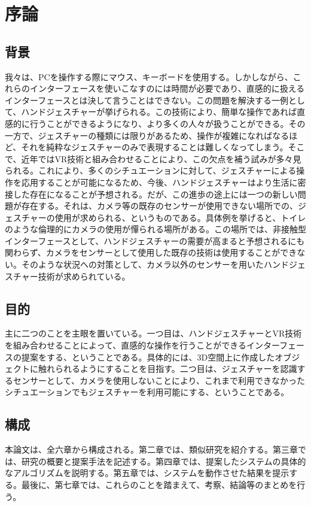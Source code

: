 \section{序論}

\subsection{背景}
我々は、PCを操作する際にマウス、キーボードを使用する。しかしながら、これらのインターフェースを使いこなすのには時間が必要であり、直感的に扱えるインターフェースとは決して言うことはできない。この問題を解決する一例として、ハンドジェスチャーが挙げられる。この技術により、簡単な操作であれば直感的に行うことができるようになり、より多くの人々が扱うことができる。その一方で、ジェスチャーの種類には限りがあるため、操作が複雑になればなるほど、それを純粋なジェスチャーのみで表現することは難しくなってしまう。そこで、近年ではVR技術と組み合わせることにより、この欠点を補う試みが多々見られる。これにより、多くのシチュエーションに対して、ジェスチャーによる操作を応用することが可能になるため、今後、ハンドジェスチャーはより生活に密接した存在になることが予想される。だが、この進歩の途上には一つの新しい問題が存在する。それは、カメラ等の既存のセンサーが使用できない場所での、ジェスチャーの使用が求められる、というものである。具体例を挙げると、トイレのような倫理的にカメラの使用が憚られる場所がある。この場所では、非接触型インターフェースとして、ハンドジェスチャーの需要が高まると予想されるにも関わらず、カメラをセンサーとして使用した既存の技術は使用することができない。そのような状況への対策として、カメラ以外のセンサーを用いたハンドジェスチャー技術が求められている。

\subsection{目的}
主に二つのことを主眼を置いている。一つ目は、ハンドジェスチャーとVR技術を組み合わせることによって、直感的な操作を行うことができるインターフェースの提案をする、ということである。具体的には、3D空間上に作成したオブジェクトに触れられるようにすることを目指す。二つ目は、ジェスチャーを認識するセンサーとして、カメラを使用しないことにより、これまで利用できなかったシチュエーションでもジェスチャーを利用可能にする、ということである。

\subsection{構成}
本論文は、全六章から構成される。第二章では、類似研究を紹介する。第三章では、研究の概要と提案手法を記述する。第四章では、提案したシステムの具体的なアルゴリズムを説明する。第五章では、システムを動作させた結果を提示する。最後に、第七章では、これらのことを踏まえて、考察、結論等のまとめを行う。